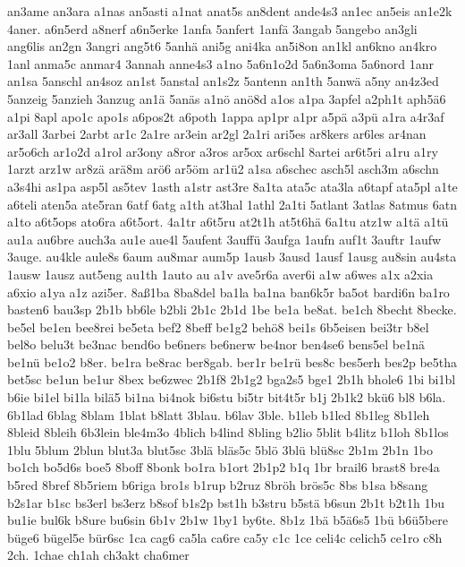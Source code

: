 {an3ame an3ara a1nas an5asti a1nat anat5s an8dent ande4s3 an1ec an5eis
an1e2k 4aner.  a6n5erd a8nerf a6n5erke 1anfa 5anfert 1anf\"a 3angab
5angebo an3gli ang6lis an2gn 3angri ang5t6 5anh\"a ani5g ani4ka
an5i8on an1kl an6kno an4kro 1anl anma5c anmar4 3annah anne4s3 a1no
5a6n1o2d 5a6n3oma 5a6nord 1anr an1sa 5anschl an4soz an1st 5anstal
an1s2z 5antenn an1th 5anw\"a a5ny an4z3ed 5anzeig 5anzieh 3anzug
an1\"a 5an\"as a1n\"o an\"o8d a1os a1pa 3apfel a2ph1t
aph5\"a6 a1pi 8apl apo1c apo1s 
a6pos2t %
a6poth 1appa ap1pr a1pr
a5p\"a a3p\"u a1ra a4r3af ar3all 3arbei 2arbt ar1c 2a1re ar3ein
ar2gl 2a1ri ari5es ar8kers ar6les ar4nan ar5o6ch ar1o2d a1rol ar3ony
a8ror a3ros ar5ox ar6schl 8artei ar6t5ri a1ru a1ry 1arzt arz1w
ar8z\"a ar\"a8m ar\"o6 ar5\"om ar1\"u2 a1sa a6schec
asch5l asch3m a6schn a3s4hi as1pa asp5l 
as5tev 1asth 
a1str ast3re 8a1ta ata5c ata3la a6tapf ata5pl a1te a6teli aten5a
ate5ran 6atf 6atg a1th at3hal 1athl 2a1ti 5atlant 3atlas 8atmus 6atn
a1to a6t5ops ato6ra a6t5ort.  4a1tr a6t5ru at2t1h at5t6h\"a 6a1tu
atz1w a1t\"a a1t\"u au1a au6bre auch3a au1e aue4l 5aufent
3auff\"u 3aufga 1aufn auf1t 3auftr 1aufw 3auge.  au4kle aule8s 6aum
au8mar aum5p 1ausb 3ausd 1ausf 1ausg au8sin 
au4sta 1ausw 1ausz
aut5eng au1th 1auto au  a1v ave5r6a aver6i a1w a6wes a1x
a2xia a6xio a1ya a1z azi5er.  8a\ss  1ba 8ba8del ba1la ba1na
ban6k5r ba5ot bardi6n ba1ro basten6 bau3sp 2b1b bb6le b2bli 2b1c 2b1d
1be be1a be8at.  be1ch 8becht 8becke.  be5el be1en bee8rei be5eta bef2
8beff be1g2 beh\"o8 bei1s 6b5eisen bei3tr b8el bel8o belu3t be3nac
bend6o be6ners be6nerw be4nor ben4se6 bens5el be1n\"a be1n\"u
be1o2 b8er.  be1ra be8rac ber8gab.  ber1r be1r\"u bes8c bes5erh
bes2p be5tha bet5sc be1un be1ur 8bex be6zwec 2b1f8 
2b1g2
bga2s5 bge1 2b1h bhole6 1bi bi1bl b6ie bi1el bi1la bil\"a5 bi1na
bi4nok 
bi6stu bi5tr bit4t5r b1j 2b1k2 bk\"u6 bl8 b6la.
6b1lad 6blag 8blam 1blat b8latt 3blau.  b6lav 3ble.  b1leb b1led
8b1leg 8b1leh 8bleid 8bleih 6b3lein 
ble4m3o 4blich b4lind
8bling b2lio 5blit b4litz b1loh 8b1los 1blu 5blum 2blun blut3a blut5sc
3bl\"a bl\"as5c 5bl\"o 3bl\"u bl\"u8sc 2b1m 2b1n 1bo
bo1ch bo5d6s boe5 8boff 8bonk bo1ra b1ort 2b1p2 b1q 1br brail6 brast8
bre4a b5red 8bref 8b5riem b6riga bro1s b1rup b2ruz 8br\"oh
br\"os5c 8bs b1sa b8sang b2s1ar b1sc bs3erl bs3erz b8sof b1s2p
bst1h b3stru b5st\"a b6sun 2b1t b2t1h 1bu bu1ie bul6k b8ure bu6sin
6b1v 2b1w 1by1 by6te.  8b1z 
1b\"a b5\"a6s5 1b\"u
b6\"u5bere b\"uge6 b\"ugel5e b\"ur6sc 1ca cag6 ca5la ca6re
ca5y c1c 1ce celi4c celich5 ce1ro c8h 2ch.  1chae ch1ah ch3akt cha6mer
}
